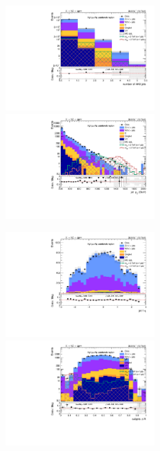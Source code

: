 \begin{figure}[!htb]
  \begin{center}
    \includegraphics[width=0.495\textwidth]{plots/v9_thesis/XVZnnhpSB/nFatJets.pdf}  
    \includegraphics[width=0.495\textwidth]{plots/v9_thesis/XVZnnhpSB/FatJet1_pt.pdf}
    
    \includegraphics[width=0.495\textwidth]{plots/v9_thesis/XVZnnhpSB/FatJet1_eta.pdf}
    \includegraphics[width=0.495\textwidth]{plots/v9_thesis/XVZnnhpSB/FatJet1_dR.pdf}


\end{center}
\end{figure}
